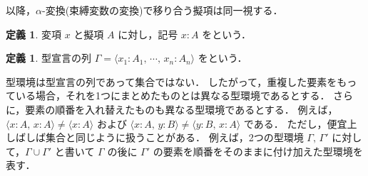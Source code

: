 \documentclass[./main]{subfiles}
\newcommand{\ocl}{\mathord{:}}
\newcommand{\textem}[1]{\textbf{\textgt{#1}}}
\newcommand{\fl}[1]{}
\newcommand{\ats}{\,}
\theoremstyle{definition}
\newtheorem{defi}[theo]{定義}
\begin{document}
以降，$ \alpha $-変換(束縛変数の変換)で移り合う擬項は同一視する．

\begin{defi}
変項 $ x $ と擬項 $ A $ に対し，記号 $ x \ocl\, A $ を\textem{型宣言\fl{type declaration}}という．
\end{defi}

\begin{defi}
型宣言の列 $ \varGamma = \langle x _1 \ocl\, A _1,\ats \cdots,\ats x _n \ocl\, A _n \rangle $ を\textem{型環境\fl{type context}}という．
\end{defi}

型環境は型宣言の列であって集合ではない．
したがって，重複した要素をもっている場合，それを1つにまとめたものとは異なる型環境であるとする．
さらに，要素の順番を入れ替えたものも異なる型環境であるとする．
例えば，$ \langle x \ocl\, A,\ats x \ocl\, A \rangle \ne \langle x \ocl\, A \rangle $ および $ \langle x \ocl\, A,\ats y \ocl\, B \rangle \ne \langle y \ocl\, B,\ats x \ocl\, A \rangle $ である．
ただし，便宜上しばしば集合と同じように扱うことがある．
例えば，2つの型環境 $ \varGamma,\ats \varGamma' $ に対して，$ \varGamma \cup \varGamma' $ と書いて $ \varGamma $ の後に $ \varGamma' $ の要素を順番をそのままに付け加えた型環境を表す．
\end{document}
